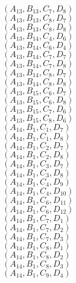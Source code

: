 \documentclass[14pt]{article}
\begin{document}
    $({A}_{13}, {B}_{13}, {C}_{7}, {D}_{8}) $ \\ 
    $({A}_{13}, {B}_{13}, {C}_{8}, {D}_{7}) $ \\ 
    $({A}_{13}, {B}_{13}, {C}_{8}, {D}_{8}) $ \\ 
    $({A}_{13}, {B}_{14}, {C}_{4}, {D}_{6}) $ \\ 
    $({A}_{13}, {B}_{14}, {C}_{6}, {D}_{4}) $ \\ 
    $({A}_{13}, {B}_{14}, {C}_{7}, {D}_{7}) $ \\ 
    $({A}_{13}, {B}_{14}, {C}_{7}, {D}_{8}) $ \\ 
    $({A}_{13}, {B}_{14}, {C}_{8}, {D}_{7}) $ \\ 
    $({A}_{13}, {B}_{14}, {C}_{8}, {D}_{8}) $ \\ 
    $({A}_{13}, {B}_{15}, {C}_{6}, {D}_{7}) $ \\ 
    $({A}_{13}, {B}_{15}, {C}_{6}, {D}_{8}) $ \\ 
    $({A}_{13}, {B}_{15}, {C}_{7}, {D}_{6}) $ \\ 
    $({A}_{13}, {B}_{15}, {C}_{8}, {D}_{6}) $ \\ 
    $({A}_{14}, {B}_{1}, {C}_{1}, {D}_{7}) $ \\ 
    $({A}_{14}, {B}_{1}, {C}_{1}, {D}_{8}) $ \\ 
    $({A}_{14}, {B}_{1}, {C}_{2}, {D}_{7}) $ \\ 
    $({A}_{14}, {B}_{1}, {C}_{2}, {D}_{8}) $ \\ 
    $({A}_{14}, {B}_{1}, {C}_{3}, {D}_{7}) $ \\ 
    $({A}_{14}, {B}_{1}, {C}_{3}, {D}_{8}) $ \\ 
    $({A}_{14}, {B}_{1}, {C}_{4}, {D}_{9}) $ \\ 
    $({A}_{14}, {B}_{1}, {C}_{4}, {D}_{10}) $ \\ 
    $({A}_{14}, {B}_{1}, {C}_{6}, {D}_{11}) $ \\ 
    $({A}_{14}, {B}_{1}, {C}_{6}, {D}_{12}) $ \\ 
    $({A}_{14}, {B}_{1}, {C}_{7}, {D}_{1}) $ \\ 
    $({A}_{14}, {B}_{1}, {C}_{7}, {D}_{2}) $ \\ 
    $({A}_{14}, {B}_{1}, {C}_{7}, {D}_{3}) $ \\ 
    $({A}_{14}, {B}_{1}, {C}_{8}, {D}_{1}) $ \\ 
    $({A}_{14}, {B}_{1}, {C}_{8}, {D}_{2}) $ \\ 
    $({A}_{14}, {B}_{1}, {C}_{8}, {D}_{3}) $ \\ 
    $({A}_{14}, {B}_{1}, {C}_{9}, {D}_{4}) $ \\ 
\end{document}
